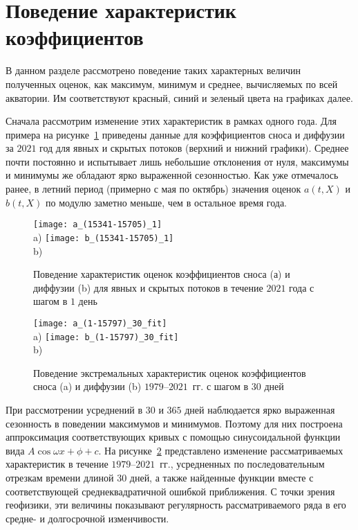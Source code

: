 \section{Поведение характеристик коэффициентов}

В данном разделе рассмотрено поведение таких характерных величин полученных оценок, как максимум, минимум и среднее, вычисляемых по всей акватории.
Им соответствуют красный, синий и зеленый цвета на графиках далее.

Сначала рассмотрим изменение этих характеристик в рамках одного года. Для примера на рисунке~\ref{fig_ab_daily} приведены данные для коэффициентов сноса и диффузии за $2021$ год для явных и скрытых потоков (верхний и нижний графики).
Среднее почти постоянно и испытывает лишь небольшие отклонения от нуля, максимумы и минимумы же обладают ярко выраженной сезонностью. Как уже отмечалось ранее, в летний период (примерно с мая по октябрь) значения оценок $a(t,X)$ и $b(t,X)$ по модулю заметно меньше, чем в остальное время года. 

\begin{figure}[!h]
	\centering
	\texttt{[image: a\_(15341-15705)\_1]}\\
	a)
	\texttt{[image: b\_(15341-15705)\_1]}
	\\
	b)
	
	\caption{Поведение характеристик оценок коэффициентов сноса (а) и диффузии (b) для явных и скрытых потоков в течение $2021$ года с шагом в $1$ день}
	\label{fig_ab_daily}
\end{figure}

\begin{figure}[h!]
	\centering
	\texttt{[image: a\_(1-15797)\_30\_fit]}\\
	a)
	\texttt{[image: b\_(1-15797)\_30\_fit]}\\
	b)
	\caption{Поведение экстремальных характеристик оценок коэффициентов сноса (a) и диффузии (b) $1979$--$2021$~гг. с шагом в $30$ дней}
	\label{fig_ab_monthly}
\end{figure}

При рассмотрении усреднений в $30$ и $365$ дней наблюдается ярко выраженная сезонность в поведении максимумов и минимумов. Поэтому для них построена аппроксимация соответствующих кривых с помощью синусоидальной функции вида $A \cos{\omega x + \phi} + c$. На рисунке~\ref{fig_ab_monthly} представлено изменение рассматриваемых характеристик в течение $1979$--$2021$~гг., усредненных по последовательным отрезкам времени длиной $30$ дней, а также найденные функции вместе с соответствующей среднеквадратичной ошибкой приближения. С точки зрения геофизики, эти величины показывают регулярность рассматриваемого ряда в его средне- и долгосрочной изменчивости.

